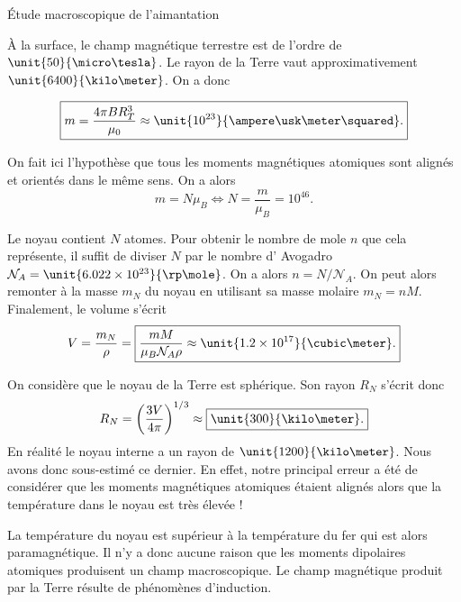 \begin{corr}{Étude macroscopique de l'aimantation}
\begin{corrlist}
	\item À la surface, le champ magnétique terrestre est de l'ordre de
	  $\unit{50}{\micro \tesla}$. Le rayon de la Terre vaut approximativement
	  $\unit{6400}{\kilo \meter}$. On a donc
	  
	  \begin{equation*}
		  \boxed{ m = \dfrac{4 \pi B R_T^3}{\mu_0} \approx \unit{10^{23}}{\ampere
		  \usk \meter \squared}.} 
	  \end{equation*}

	 \item On fait ici l'hypothèse que tous les moments magnétiques atomiques
	   sont alignés et orientés dans le même sens. On a alors
	   \begin{equation*}
		   m = N\mu_B \iff \boxed{N = \dfrac{m}{\mu_B} = 10^{46}.}
	   \end{equation*}

	 \item Le noyau contient $N$ atomes. Pour obtenir le nombre de mole 
	   $n$ que cela représente, il suffit de diviser $N$ par le nombre d'
	   Avogadro $\mathcal{N}_A = \unit{6.022 \times 10^{23}}{\rp \mole}$.
	   On a alors $n = N/\mathcal{N}_A$. On peut alors remonter à la masse 
	   $m_N$ du noyau en utilisant sa masse molaire $m_N = nM$. Finalement,
	   le volume s'écrit
	   \begin{equation*}
		   V = \dfrac{m_N}{\rho} = \boxed{\dfrac{mM}{\mu_B \mathcal{N}_A \rho}
	   \approx \unit{1.2 \times 10^{17}}{\cubic \meter}.}
	   \end{equation*}

   \item On considère que le noyau de la Terre est sphérique. Son rayon $R_N$ 
     s'écrit donc
     \begin{equation*}
	     R_N = \left(\dfrac{3V}{4\pi}\right)^{1/3} \approx 
	     \boxed{\unit{300}{\kilo \meter}.}
     \end{equation*}
     En réalité le noyau interne a un rayon de $\unit{1200}{\kilo \meter}$. Nous 
     avons donc sous-estimé ce dernier. En effet, notre principal erreur a été 
     de considérer que les moments magnétiques atomiques étaient alignés
     alors que la température dans le noyau est très élevée !
  \item La température du noyau est supérieur à la température du fer qui est alors
    paramagnétique. Il n'y a donc aucune raison que les moments dipolaires atomiques
    produisent un champ macroscopique. Le champ magnétique produit par la
    Terre résulte de phénomènes d'induction.
\end{corrlist}



\end{corr}
